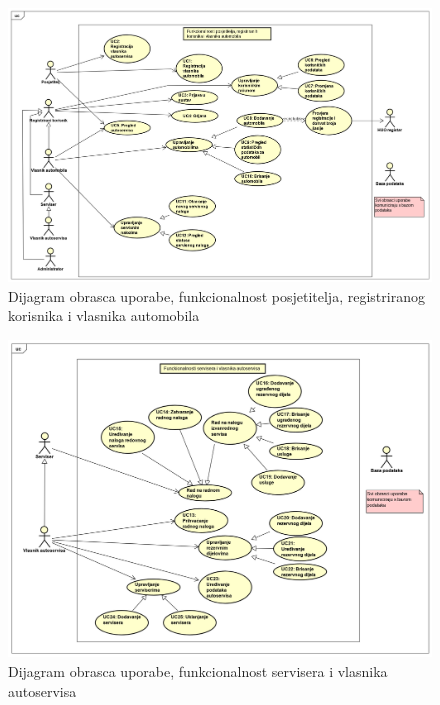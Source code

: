 \begin{figure}[H]
	\includegraphics[width=\linewidth]{dijagrami/diagram0.png}
	\centering
	\caption{Dijagram obrasca uporabe, funkcionalnost posjetitelja,
		registriranog korisnika i vlasnika automobila}
	\label{fig:diagram0}
\end{figure}

\begin{figure}[H]
	\includegraphics[width=\linewidth]{dijagrami/diagram1.png}
	\centering
	\caption{Dijagram obrasca uporabe, funkcionalnost servisera i vlasnika
		autoservisa}
	\label{fig:diagram1}
\end{figure}

